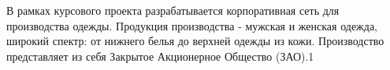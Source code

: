 В рамках курсового проекта разрабатывается корпоративная сеть для производства одежды. Продукция производства - мужская и женская одежда, широкий спектр: от нижнего белья до верхней одежды из кожи.
Производство представляет из себя Закрытое Акционерное Общество (ЗАО).1